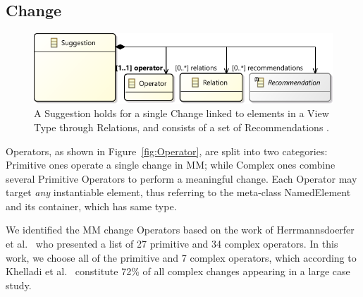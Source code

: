 \subsection{Change}
\label{sec:Suggestion:Change}

\begin{figure}[t]
    \centering
    \includegraphics[width=\columnwidth]{images/Suggestion.pdf}
    \caption{A \textsf{Suggestion} holds for a single \textsf{Change} linked to 
		elements in a View Type through \textsf{Relation}s, and consists of a set of \textsf{Recommendation}s 
		.}
    \label{fig:Suggestion}
\end{figure}

\textsf{Operator}s, as shown in Figure~\ref{fig:Operator}, are split into two categories:
\textsf{Primitive} ones operate a single change in \textsf{MM}; while
\textsf{Complex} ones combine several \textsf{Primitive} \textsf{Operator}s
to perform a meaningful change. 
Each \textsf{Operator} may target \emph{any} instantiable \metamodel element, 
thus referring to the meta-class \textsf{NamedElement} and its container, which has same type.

We identified the MM change \textsf{Operator}s based on the work of Herrmannsdoerfer et al.~\cite{herrmannsdoerfer_extensive_2011} who presented a list of 27 primitive and 34 complex operators. In this work, we choose all of the primitive and 7 complex operators, which according to Khelladi et al.~\cite{khelladi_detecting_2015} constitute 72\% of all complex changes appearing in a large case study. 


